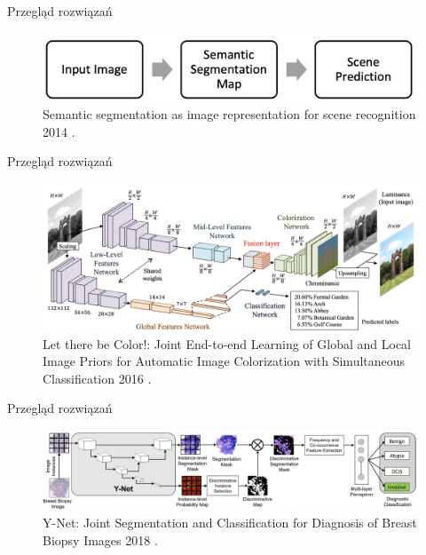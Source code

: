 \documentclass[10pt]{beamer}
\begin{document}
\begin{frame}{Przegląd rozwiązań}

\begin{figure}
    \includegraphics[width=\textwidth]{images/linear-seg-reg-pipeline.png}
    \caption{Semantic segmentation as image representation for scene recognition 2014 \cite{bassiouny2014semantic}.}
\end{figure}
\end{frame}

\begin{frame}{Przegląd rozwiązań}

    \begin{figure}
        \includegraphics[width=\textwidth]{images/global-local-features.png}
        \caption{Let there be Color!: Joint End-to-end Learning of Global and Local Image Priors for Automatic Image Colorization with Simultaneous Classification 2016 \cite{iizuka2016let}.}
    \end{figure}
    \end{frame}
\begin{frame}{Przegląd rozwiązań}

    \begin{figure}
        \includegraphics[width=\textwidth]{images/y-net.png}
        \caption{Y-Net: Joint Segmentation and Classification for Diagnosis of Breast Biopsy Images 2018 \cite{mehta2018net}.}
    \end{figure}
    \end{frame}
\end{document}
